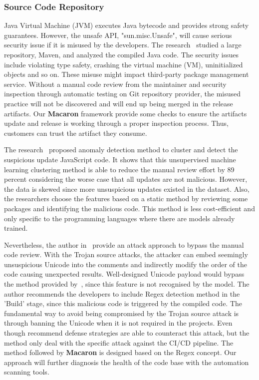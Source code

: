 \subsubsection{Source Code Repository}
Java Virtual Machine (JVM) executes Java bytecode and provides strong safety
guarantees. However, the unsafe API, "sun.misc.Unsafe", will cause serious 
security issue if it is misused by the developers. The research~\cite{mastrangelo2015use} 
studied a large repository, Maven, and analyzed the compiled Java code. The 
security issues include violating type safety, crashing the virtual machine (VM), 
uninitialized objects and so on. These misuse might impact third-party package 
management service. Without a manual code review from the maintainer and security inspection through automatic testing on Git repository
provider, the misused practice will not be discovered and will end up being merged in the release
artifacts. Our \textbf{Macaron} framework provide some checks to ensure the artifacts update and release
is working through a proper inspection process. Thus, customers can trust the artifact they consume.

The research~\cite{garrett2019detecting} proposed anomaly detection method to cluster and detect 
the suspicious update JavaScript code. It shows that this unsupervised machine learning 
clustering method is able to reduce the manual review effort by 89 percent considering the worse
case that all updates are not malicious. However, the data is skewed since more unsuspicious updates
existed in the dataset. Also, the researchers choose the features based on a static method by reviewing some packages and identifying the malicious code. 
This method is less cost-efficient and only specific to the programming languages where there are models already trained. 

Nevertheless, the author in~\cite{boucher2023trojan} provide an attack approach to bypass the manual code review. 
With the Trojan source attacks, the attacker can embed seemingly unsuspicious Unicode into
the comments and indirectly modify the order of the code causing unexpected results. 
Well-designed Unicode payload would bypass the method provided by~\cite{garrett2019detecting}, 
since this feature is not recognised by the model. The author recommends the developers to include 
Regex detection method in the 'Build' stage, since this malicious code is triggered by the compiled code.
The fundamental way to avoid being compromised by the Trojan source attack is through banning the 
Unicode when it is not required in the projects. Even though recommend defense strategies 
are able to counteract this attack, but the method only deal with the specific attack against the 
CI/CD pipeline. The method followed by \textbf{Macaron} is designed based on the Regex concept. Our approach
will further diagnosis the health of the code base with the automation scanning tools.

